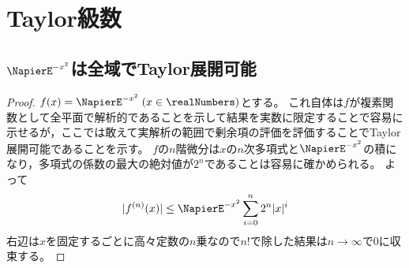 \chapter{Taylor級数}
    \section{\texorpdfstring{$\NapierE^{-x^2}$}{e\string^(-x\string^2)}は全域でTaylor展開可能}
        \begin{proof}
            \quad\par
            $f(x) = \NapierE^{-x^2}\;(x\in\realNumbers)$とする。
            これ自体は$f$が複素関数として全平面で解析的であることを示して結果を実数に限定することで容易に示せるが，ここでは敢えて実解析の範囲で剰余項の評価を評価することでTaylor展開可能であることを示す。
            $f$の$n$階微分は$x$の$n$次多項式と$\NapierE^{-x^2}$の積になり，多項式の係数の最大の絶対値が$2^n$であることは容易に確かめられる。
            よって
            \[ |f^{(n)}(x)| \leq \NapierE^{-x^2}\sum_{i=0}^n 2^n |x|^i \]
            右辺は$x$を固定するごとに高々定数の$n$乗なので$n!$で除した結果は$n\to\infty$で0に収束する。
        \end{proof}
